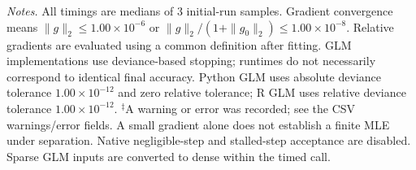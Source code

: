 \documentclass[10pt,a4paper]{article}
\begin{document}
\noindent\textit{Notes.} All timings are medians of 3 initial-run samples.
Gradient convergence means $\|g\|_2\leq 1.00\times10^{-6}$ or $\|g\|_2/(1+\|g_0\|_2)\leq 1.00\times10^{-8}$.
Relative gradients are evaluated using a common definition after fitting. GLM implementations use deviance-based stopping; runtimes do not necessarily correspond to identical final accuracy.
Python GLM uses absolute deviance tolerance $1.00\times10^{-12}$ and zero relative tolerance; R GLM uses relative deviance tolerance $1.00\times10^{-12}$.
$^{\ddagger}$A warning or error was recorded; see the CSV warnings/error fields. A small gradient alone does not establish a finite MLE under separation.
Native negligible-step and stalled-step acceptance are disabled.
Sparse GLM inputs are converted to dense within the timed call.
\par
\endgroup
\end{document}
